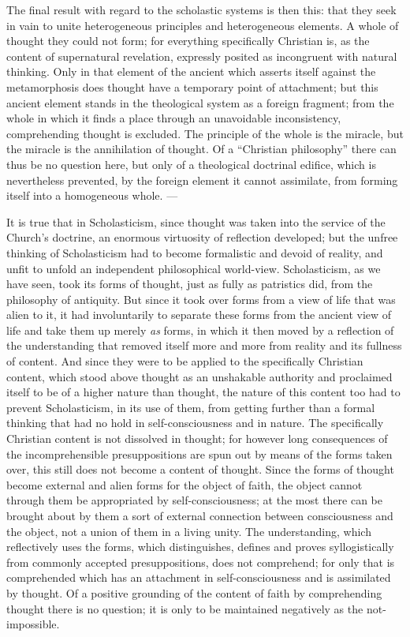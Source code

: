 The final result with regard to the scholastic systems is then this: that they seek in vain to unite heterogeneous principles and heterogeneous elements. A whole of thought they could not form; for everything specifically Christian is, as the content of supernatural revelation, expressly posited as incongruent with natural thinking. Only in that element of the ancient which asserts itself against the metamorphosis does thought have a temporary point of attachment; but this ancient element stands in the theological system as a foreign fragment; from the whole in which it finds a place through an unavoidable inconsistency, comprehending thought is excluded. The principle of the whole is the miracle, but the miracle is the annihilation of thought. Of a ``Christian philosophy'' there can thus be no question here, but only of a theological doctrinal edifice, which is nevertheless prevented, by the foreign element it cannot assimilate, from forming itself into a homogeneous whole. ---

It is true that in Scholasticism, since thought was taken into the service of the Church's doctrine, an enormous virtuosity of reflection developed; but the unfree thinking of Scholasticism had to become formalistic and devoid of reality, and unfit to unfold an independent philosophical world-view. Scholasticism, as we have seen, took its forms of thought, just as fully as patristics did, from the philosophy of antiquity. But since it took over forms from a view of life that was alien to it, it had involuntarily to separate these forms from the ancient view of life and take them up merely \emph{as} forms, in which it then moved by a reflection of the understanding that removed itself more and more from reality and its fullness of content. And since they were to be applied to the specifically Christian content, which stood above thought as an unshakable authority and proclaimed itself to be of a higher nature than thought, the nature of this content too had to prevent Scholasticism, in its use of them, from getting further than a formal thinking that had no hold in self-consciousness and in nature. The specifically Christian content is not dissolved in thought; for however long consequences of the incomprehensible presuppositions are spun out by means of the forms taken over, this still does not become a content of thought. Since the forms of thought become external and alien forms for the object of faith, the object cannot through them be appropriated by self-consciousness; at the most there can be brought about by them a sort of external connection between consciousness and the object, not a union of them in a living unity. The understanding, which reflectively uses the forms, which distinguishes, defines and proves syllogistically from commonly accepted presuppositions, does not comprehend; for only that is comprehended which has an attachment in self-consciousness and is assimilated by thought. Of a positive grounding of the content of faith by comprehending thought there is no question; it is only to be maintained negatively as the not-impossible.

